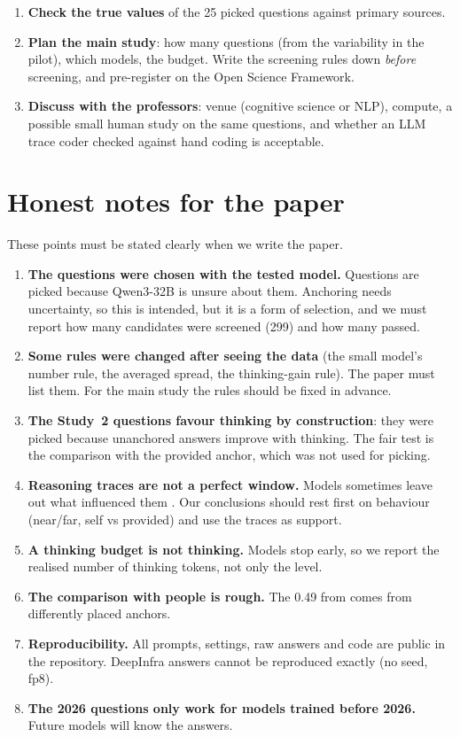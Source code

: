 \documentclass[11pt,a4paper]{article}
\begin{document}
\begin{enumerate}
  \item \textbf{Check the true values} of the 25 picked questions against primary sources.
  \item \textbf{Plan the main study}: how many questions (from the variability in the pilot), which models, the budget. Write the screening rules down \emph{before} screening, and pre-register on the Open Science Framework.
  \item \textbf{Discuss with the professors}: venue (cognitive science or NLP), compute, a possible small human study on the same questions, and whether an LLM trace coder checked against hand coding is acceptable.
\end{enumerate}

\section{Honest notes for the paper}
\label{sec:honest}

These points must be stated clearly when we write the paper.
\begin{enumerate}
  \item \textbf{The questions were chosen with the tested model.} Questions are picked because Qwen3-32B is unsure about them. Anchoring needs uncertainty, so this is intended, but it is a form of selection, and we must report how many candidates were screened (299) and how many passed.
  \item \textbf{Some rules were changed after seeing the data} (the small model's number rule, the averaged spread, the thinking-gain rule). The paper must list them. For the main study the rules should be fixed in advance.
  \item \textbf{The Study~2 questions favour thinking by construction}: they were picked because unanchored answers improve with thinking. The fair test is the comparison with the provided anchor, which was not used for picking.
  \item \textbf{Reasoning traces are not a perfect window.} Models sometimes leave out what influenced them \citep{turpin2023language,chen2025reasoning}. Our conclusions should rest first on behaviour (near/far, self vs provided) and use the traces as support.
  \item \textbf{A thinking budget is not thinking.} Models stop early, so we report the realised number of thinking tokens, not only the level.
  \item \textbf{The comparison with people is rough.} The 0.49 from \citet{jacowitz1995measures} comes from differently placed anchors.
  \item \textbf{Reproducibility.} All prompts, settings, raw answers and code are public in the repository. DeepInfra answers cannot be reproduced exactly (no seed, fp8).
  \item \textbf{The 2026 questions only work for models trained before 2026.} Future models will know the answers.
\end{enumerate}
\end{document}
